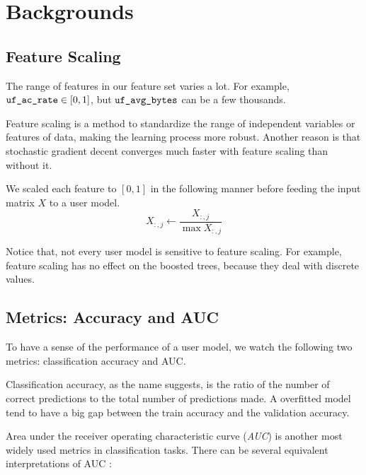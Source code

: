 \section{Backgrounds}

    \subsection{Feature Scaling}

        The range of features in our feature set varies a lot.
        For example, $\verb|uf_ac_rate| \in [0,1]$, but $\verb|uf_avg_bytes|$ can be a few thousands.

        Feature scaling is a method to standardize the range of independent variables or features of data,
        making the learning process more robust.
        Another reason is that stochastic gradient decent converges much faster with feature scaling than without it.
        \cite{ioffe_batch_2015}

        We scaled each feature to $[0,1]$ in the following manner before feeding the input matrix $X$ to a user model.
        \[
        X_{:,j} \leftarrow \frac{X_{:,j}}{\max X_{:,j}}
        \]

        Notice that, not every user model is sensitive to feature scaling.
        For example, feature scaling has no effect on the boosted trees, because they deal with discrete values.

    \subsection{Metrics: Accuracy and AUC}

        To have a sense of the performance of a user model, we watch the following two metrics:
        classification accuracy and AUC.

        Classification accuracy, as the name suggests, is the ratio of
        the number of correct predictions to the total number of predictions made.
        A overfitted model tend to have a big gap between the train accuracy and the validation accuracy.

        Area under the receiver operating characteristic curve (\emph{AUC})
        is another most widely used metrics in classification tasks.
        There can be several equivalent interpretations of AUC \cite{flach_putting_2007}:

